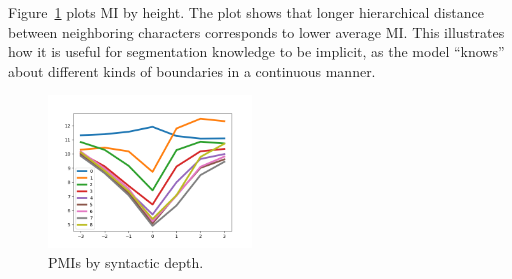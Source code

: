 Figure~\ref{fig:syntax-depth} plots MI by height.
The plot shows that longer hierarchical distance between neighboring characters corresponds to lower average MI.
This illustrates how it is useful for segmentation knowledge to be implicit, as the model ``knows'' about different kinds of boundaries in a continuous manner.

\begin{figure}
\includegraphics[width=0.48\textwidth]{figures/segmentation-profile-pmis-german-all-heights.png}
\caption{PMIs by syntactic depth.}\label{fig:syntax-depth}
\end{figure}


